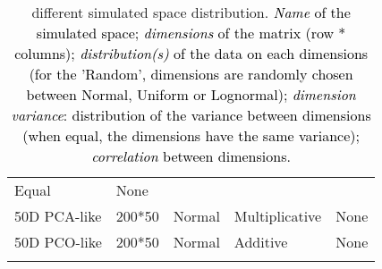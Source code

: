 \documentclass[]{article}
\begin{document}
\begin{longtable}[]{@{}lllll@{}}
\begin{minipage}[t]{0.21\columnwidth}
Equal\strut
\end{minipage} & \begin{minipage}[t]{0.13\columnwidth}\raggedright\strut
None\strut
\end{minipage}\tabularnewline
\begin{minipage}[t]{0.12\columnwidth}\raggedright\strut
50D PCA-like\strut
\end{minipage} & \begin{minipage}[t]{0.12333\columnwidth}\raggedright\strut
200*50\strut
\end{minipage} & \begin{minipage}[t]{0.31\columnwidth}\raggedright\strut
Normal\strut
\end{minipage} & \begin{minipage}[t]{0.21\columnwidth}\raggedright\strut
Multiplicative\strut
\end{minipage} & \begin{minipage}[t]{0.13\columnwidth}\raggedright\strut
None\strut
\end{minipage}\tabularnewline
\begin{minipage}[t]{0.12\columnwidth}\raggedright\strut
50D PCO-like\strut
\end{minipage} & \begin{minipage}[t]{0.12333\columnwidth}\raggedright\strut
200*50\strut
\end{minipage} & \begin{minipage}[t]{0.31\columnwidth}\raggedright\strut
Normal\strut
\end{minipage} & \begin{minipage}[t]{0.21\columnwidth}\raggedright\strut
Additive\strut
\end{minipage} & \begin{minipage}[t]{0.13\columnwidth}\raggedright\strut
None\strut
\end{minipage}\tabularnewline
\bottomrule
\caption{different simulated space distribution.
\textcolor{black}{ \textit{Name} of the simulated space; \textit{dimensions} of the matrix (row * columns); \textit{distribution(s)} of the data on each dimensions (for the 'Random', dimensions are randomly chosen between Normal, Uniform or Lognormal); \textit{dimension variance}: distribution of the variance between dimensions (when equal, the dimensions have the same variance); \textit{correlation} between dimensions.}}
\end{longtable}

\renewcommand\baselinestretch{1.6}\selectfont
\end{document}
